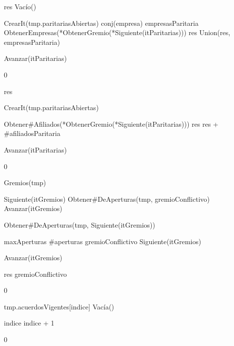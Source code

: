 {
	\state res \asig Vacío()
	\state

	\state {} \asig CrearIt(tmp.paritariasAbiertas)
		\state
		\state conj(empresa) empresasParitaria \asig ObtenerEmpresas(*ObtenerGremio(*Siguiente(itParitarias)))
		\state res \asig Union(res, empresasParitaria)

		\state
		\state Avanzar(itParitarias)
	\endwhile
}
{0}

{
	\state res 
	\state

	\state {} \asig CrearIt(tmp.paritariasAbiertas)
		\state

		\state {} \asig Obtener\#Afiliados(*ObtenerGremio(*Siguiente(itParitarias)))
		\state res \asig res + \#afiliadosParitaria

		\state
		\state Avanzar(itParitarias)
	\endwhile
}
{0}

{
	\state {} \asig Gremios(tmp)
	\state

	\state {} \asig Siguiente(itGremios)
	\state {} \asig Obtener\#DeAperturas(tmp, gremioConflictivo)
	\state Avanzar(itGremios)
	\state

		\state

		\state {} \asig Obtener\#DeAperturas(tmp, Siguiente(itGremios))


			\state maxAperturas \asig \#aperturas
			\state gremioConflictivo \asig Siguiente(itGremios)
		\endif

		\state
		\state Avanzar(itGremios)
	\endwhile
	\state

	\state res \asig *gremioConflictivo
}
{0}

{
	\state {} 
		\state

		\state tmp.acuerdosVigentes[indice] \asig Vacía()

		\state
		\state indice \asig indice + 1
	\endwhile

}
{0}

